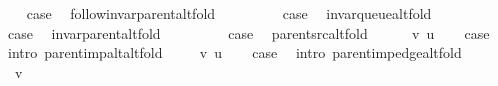\begin{isabellebody}
\ \ \isamarkupfalse%
\ {\isacharquery}{\kern0pt}case\ \isamarkupfalse%
\ follow{\isacharunderscore}{\kern0pt}invar{\isacharunderscore}{\kern0pt}parent{\isacharunderscore}{\kern0pt}alt{\isacharunderscore}{\kern0pt}fold\ \isacommand{{\isachardot}{\kern0pt}}\isamarkupfalse%
\isanewline
{}\isamarkupfalse%
\isanewline
\ \ \isamarkupfalse%
\ {}\isanewline
\ \ \isamarkupfalse%
\ {\isacharquery}{\kern0pt}case\ \isamarkupfalse%
\ invar{\isacharunderscore}{\kern0pt}queue{\isacharunderscore}{\kern0pt}alt{\isacharunderscore}{\kern0pt}fold\ \isacommand{{\isachardot}{\kern0pt}}\isamarkupfalse%
\isanewline
{}\isamarkupfalse%
\isanewline
\ \ \isamarkupfalse%
\ {}\isanewline
\ \ \isamarkupfalse%
\ {\isacharquery}{\kern0pt}case\ \isamarkupfalse%
\ invar{\isacharunderscore}{\kern0pt}parent{\isacharunderscore}{\kern0pt}alt{\isacharunderscore}{\kern0pt}fold\ \isacommand{{\isachardot}{\kern0pt}}\isamarkupfalse%
\isanewline
{}\isamarkupfalse%
\isanewline
\ \ \isamarkupfalse%
\ {}\isanewline
\ \ \isamarkupfalse%
\ {\isacharquery}{\kern0pt}case\ \isamarkupfalse%
\ parent{\isacharunderscore}{\kern0pt}src{\isacharunderscore}{\kern0pt}alt{\isacharunderscore}{\kern0pt}fold\ \isacommand{{\isachardot}{\kern0pt}}\isamarkupfalse%
\isanewline
{}\isamarkupfalse%
\isanewline
\ \ \isamarkupfalse%
\ {\isacharparenleft}{\kern0pt}{}\ v\ u{\isacharparenright}{\kern0pt}\isanewline
\ \ \isamarkupfalse%
\ {\isacharquery}{\kern0pt}case\ \isamarkupfalse%
\ {\isacharparenleft}{\kern0pt}intro\ parent{\isacharunderscore}{\kern0pt}imp{\isacharunderscore}{\kern0pt}alt{\isacharunderscore}{\kern0pt}alt{\isacharunderscore}{\kern0pt}fold{\isacharparenright}{\kern0pt}\isanewline
{}\isamarkupfalse%
\isanewline
\ \ \isamarkupfalse%
\ {\isacharparenleft}{\kern0pt}{}\ v\ u{\isacharparenright}{\kern0pt}\isanewline
\ \ \isamarkupfalse%
\ {\isacharquery}{\kern0pt}case\ \isamarkupfalse%
\ {\isacharparenleft}{\kern0pt}intro\ parent{\isacharunderscore}{\kern0pt}imp{\isacharunderscore}{\kern0pt}edge{\isacharunderscore}{\kern0pt}alt{\isacharunderscore}{\kern0pt}fold{\isacharparenright}{\kern0pt}\isanewline
{}\isamarkupfalse%
\isanewline
\ \ \isamarkupfalse%
\ {\isacharparenleft}{\kern0pt}{}\ v{\isacharparenright}{\kern0pt}\isanewline

\end{isabellebody}

